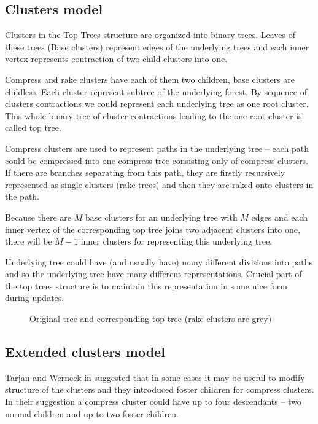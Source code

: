 \subsection{Clusters model}

Clusters in the Top Trees structure are organized into binary trees. Leaves of
these trees (Base clusters) represent edges of the underlying trees and each
inner vertex represents contraction of two child clusters into one.

Compress and rake clusters have each of them two children, base clusters are
childless. Each cluster represent subtree of the underlying forest. By sequence
of clusters contractions we could represent each underlying tree as one {\I root
cluster}. This whole binary tree of cluster contractions leading to the one root
cluster is called {\I top tree}.

Compress clusters are used to represent paths in the underlying tree -- each
path could be compressed into one {\I compress tree} consisting only of compress
clusters. If there are branches separating from this path, they are firstly
recursively represented as single clusters ({\I rake trees}) and then they are
{\I raked onto} clusters in the path.

Because there are $M$ base clusters for an underlying tree with $M$ edges and
each inner vertex of the corresponding top tree joins two adjacent clusters into
one, there will be $M-1$ inner clusters for representing this underlying tree.

Underlying tree could have (and usually have) many different divisions into
paths and so the underlying tree have many different representations. Crucial
part of the top trees structure is to maintain this representation in some nice
form during updates.

\begin{figure}[H]
\centering
{}
\caption[Original tree and corresponding top tree]
{Original tree and corresponding top tree (rake clusters are grey)}
\end{figure}

\subsection{Extended clusters model}

Tarjan and Werneck in \cite{SelfAdjustingTT} suggested that in some cases it may
be useful to modify structure of the clusters and they introduced
{\I foster children} for {\I compress clusters}. In their suggestion a compress
cluster could have up to four descendants -- two normal children and up to two
foster children.


